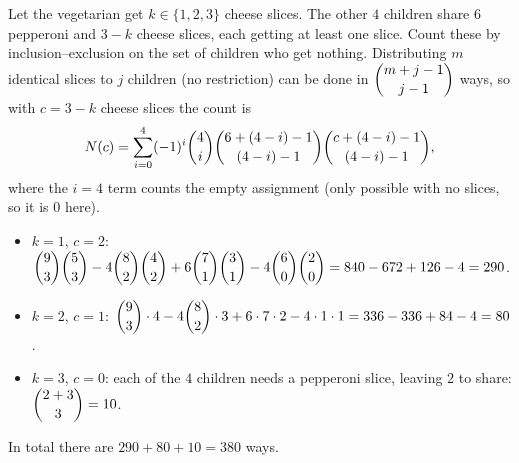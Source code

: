 Let the vegetarian get $k\in\{1,2,3\}$ cheese slices. The other $4$ children share $6$ pepperoni and $3-k$ cheese slices, each getting at least one slice. Count these by inclusion--exclusion on the set of children who get nothing. Distributing $m$ identical slices to $j$ children (no restriction) can be done in $\dbinom{m+j-1}{j-1}$ ways, so with $c=3-k$ cheese slices the count is
\[
N(c)=\sum_{i=0}^{4}(-1)^i\dbinom4i\dbinom{6+(4-i)-1}{(4-i)-1}\dbinom{c+(4-i)-1}{(4-i)-1},
\]
where the $i=4$ term counts the empty assignment (only possible with no slices, so it is $0$ here).
\begin{itemize}
\item $k=1$, $c=2$: $\dbinom93\dbinom53-4\dbinom82\dbinom42+6\dbinom71\dbinom31-4\dbinom60\dbinom20=840-672+126-4=290$.
\item $k=2$, $c=1$: $\dbinom93\cdot4-4\dbinom82\cdot3+6\cdot7\cdot2-4\cdot1\cdot1=336-336+84-4=80$.
\item $k=3$, $c=0$: each of the $4$ children needs a pepperoni slice, leaving $2$ to share: $\dbinom{2+3}{3}=10$.
\end{itemize}
In total there are $290+80+10=\boxed{380}$ ways.
